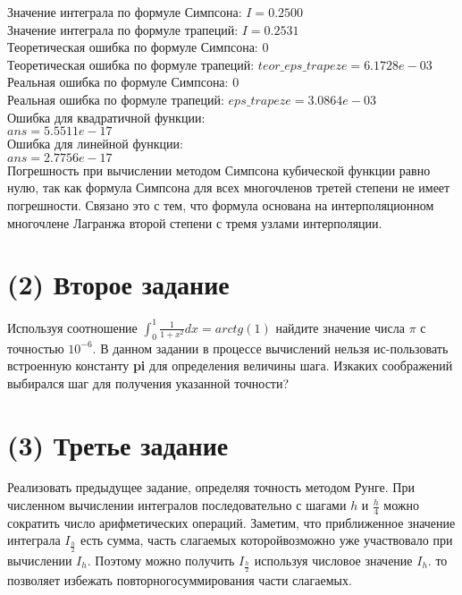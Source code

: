 Значение интеграла по формуле Симпсона: $I = 0.2500$\\
Значение интеграла по формуле трапеций: $I = 0.2531$\\
Теоретическая ошибка по формуле Симпсона: $0$\\
Теоретическая ошибка по формуле трапеций: $teor\_eps\_trapeze = 6.1728e-03$\\
Реальная ошибка по формуле Симпсона: $0$\\
Реальная ошибка по формуле трапеций: $eps\_trapeze = 3.0864e-03$\\
Ошибка для квадратичной функции:\\
$ans = 5.5511e-17$\\
Ошибка для линейной функции:\\
$ans = 2.7756e-17$\\

Погрешность при вычислении методом Симпсона кубической функции равно нулю, так как формула Симпсона для всех многочленов третей степени не имеет погрешности. Связано это с тем, что формула основана на интерполяционном многочлене Лагранжа второй степени с тремя узлами интерполяции.

\section{(2) Второе задание}
Используя соотношение $\int_{0}^{1}\frac{1}{1+x^{2}}dx = arctg(1)$ найдите значение числа $\pi$ с точностью $10^{-6}$. В данном задании в процессе вычислений нельзя ис-пользовать встроенную константу \textbf{pi} для определения величины шага. Изкаких соображений выбирался шаг для получения указанной точности?

\section{(3) Третье задание}
Реализовать предыдущее задание, определяя точность методом Рунге. При численном вычислении интегралов последовательно с шагами $h$ и $\frac{h}{4}$ можно сократить число арифметических операций. Заметим, что приближенное значение интеграла $I_{\frac{h}{2}}$ есть сумма, часть слагаемых которойвозможно уже участвовало при вычислении $I_{h}$. Поэтому можно получить $I_{\frac{h}{2}}$ используя числовое значение $I_{h}$. то позволяет избежать повторногосуммирования части слагаемых.
